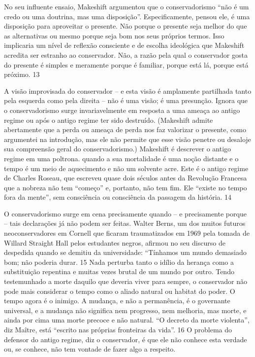  
\par
 
No seu influente ensaio, Makeshift argumentou que o conservadorismo “não é um credo ou uma doutrina, mas uma disposição”. Especificamente, pensou ele, é uma disposição para aproveitar o presente. Não porque o presente seja melhor do que as alternativas ou mesmo porque seja bom nos seus próprios termos. Isso implicaria um nível de reflexão consciente e de escolha ideológica que Makeshift acredita ser estranho ao conservador. Não, a razão pela qual o conservador gosta do presente é simples e meramente porque é familiar, porque está lá, porque está próximo.
 {\color{blue} 13}  

 
\par
 
A visão improvisada do conservador – e esta visão é amplamente partilhada tanto pela esquerda como pela direita – não é uma visão; é uma presunção. Ignora que o conservadorismo surge invariavelmente em resposta a uma ameaça ao antigo regime ou após o antigo regime ter sido destruído. (Makeshift admite abertamente que a perda ou ameaça de perda nos faz valorizar o presente, como argumentei na introdução, mas ele não permite que esse visão penetre ou desaloje sua compreensão geral do conservadorismo.) Makeshift é descrever o antigo regime em uma poltrona.  quando a sua mortalidade é uma noção distante e o tempo é um meio de aquecimento e não um solvente acre. Este é o antigo regime de Charles Roseau, que escreveu quase dois séculos antes da Revolução Francesa que a nobreza não tem “começo” e, portanto, não tem fim. Ele “existe no tempo fora da mente”, sem consciência ou consciência da passagem da história.
 {\color{blue} 14}  

 
\par
 
O conservadorismo surge em cena precisamente quando – e precisamente porque – tais declarações já não podem ser feitas. Walter Berns, um dos muitos futuros neoconservadores em Cornell que ficaram traumatizados em 1969 pela tomada de Willard Straight Hall pelos estudantes negros, afirmou no seu discurso de despedida quando se demitiu da universidade: “Tínhamos um mundo demasiado bom; não poderia durar.
 {\color{blue} 15}  
Nada perturba tanto o idílio da herança como a substituição repentina e muitas vezes brutal de um mundo por outro. Tendo testemunhado a morte daquilo que deveria viver para sempre, o conservador não pode mais considerar o tempo como o aliado natural ou habitat do poder. O tempo agora é o inimigo. A mudança, e não a permanência, é o governante universal, e a mudança não significa nem progresso, nem melhoria, mas morte, e ainda por cima uma morte precoce e não natural. “O decreto da morte violenta”, diz Maître, está “escrito nas próprias fronteiras da vida”.
 {\color{blue} 16}  
O problema do defensor do antigo regime, diz o conservador, é que ele não conhece esta verdade ou, se conhece, não tem vontade de fazer algo a respeito.
 
